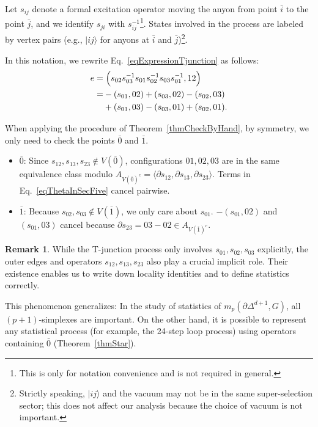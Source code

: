 \documentclass[reprint, amsmath, amssymb, showpacs, floatfix, longbibliography, aps, twocolumn, superscriptaddress, nofootinbib]{revtex4-2}
\theoremstyle{definition}
\newtheorem{remark}{Remark}[section]
\begin{document}
Let $s_{ij}$ denote a formal excitation operator moving the anyon from point $\bar{i}$ to the point $\bar{j}$, and we identify $s_{ji}$ with $s_{ij}^{-1}$\footnote{This is only for notation convenience and is not required in general.}. States involved in the process are labeled by vertex pairs (e.g., $|ij\rangle$ for anyons at $\bar{i}$ and $\bar{j}$)\footnote{Strictly speaking, $|ij\rangle$ and the vacuum may not be in the same super-selection sector; this does not affect our analysis because the choice of vacuum is not important.  }.

In this notation, we rewrite Eq.~\eqref{eqExpressionTjunction} as follows:
\begin{equation}\label{eqThetaInSecFive}
	\begin{aligned}
		e =&\;\Bigl(s_{02} s_{03}^{-1} s_{01} s_{02}^{-1} s_{03} s_{01}^{-1}, 12\Bigr) \\
		=& -(s_{01}, 02) + (s_{03}, 02) - (s_{02}, 03) \\&+ (s_{01}, 03) - (s_{03}, 01) + (s_{02}, 01).
	\end{aligned}
\end{equation}

When applying the procedure of Theorem~\ref{thmCheckByHand}, by symmetry, we only need to check the points $\bar{0}$ and $\bar{1}$.

\begin{itemize}
\item $\overline{0}$: Since $s_{12},s_{13},s_{23}\notin V(\overline{0})$, configurations $01,02,03$ are in the same equivalence class modulo $A_{V(\overline{0})^c}=\langle \partial s_{12},\partial s_{13},\partial s_{23}\rangle$. Terms in Eq.~\eqref{eqThetaInSecFive} cancel pairwise.
	\item $\overline{1}$: Because $s_{02},s_{03}\notin V(\overline{1})$, we only care about $s_{01}$. $-(s_{01},02)$ and $(s_{01},03)$ cancel because $\partial{s_{23}}=03-02\in A_{V(\overline{1})^c}$.
\end{itemize}

\begin{remark}\label{remarkOuterEdges}
	While the T-junction process only involves $s_{01},s_{02},s_{03}$ explicitly, the outer edges and operators $s_{12},s_{13},s_{23}$ also play a crucial implicit role. Their existence enables us to write down locality identities and to define statistics correctly. 
	
	This phenomenon generalizes: In the study of statistics of $m_p(\partial\Delta^{d+1},G)$, all $(p+1)$-simplexes are important. On the other hand, it is possible to represent
	any statistical process (for example, the 24-step loop process) using operators containing $\bar{0}$ (Theorem~\ref{thmStar}).
\end{remark}
\end{document}
